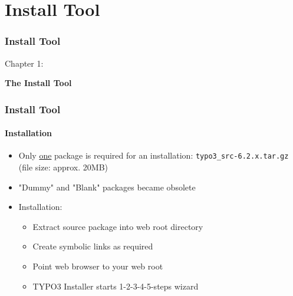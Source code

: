 %

\section{Install Tool}
\begin{frame}[fragile]
	\frametitle{Install Tool}

	\begin{center}\huge{Chapter 1:}\end{center}
	\begin{center}\huge{\color{typo3darkgrey}\textbf{The Install Tool}}\end{center}

\end{frame}


\begin{frame}[fragile]
	\frametitle{Install Tool}
	\framesubtitle{Installation}

	\begin{itemize}
		\item Only \underline{one} package is required for an installation:\newline
				\texttt{typo3\_src-6.2.x.tar.gz} (file size: approx. 20MB)
		\item "Dummy" and "Blank" packages became obsolete
		\item Installation:
			\begin{itemize}
				\item Extract source package into web root directory
				\item Create symbolic links as required
				\item Point web browser to your web root
				\item TYPO3 Installer starts 1-2-3-4-5-steps wizard
			\end{itemize}

	\end{itemize}

\end{frame}

